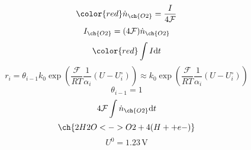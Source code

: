 \documentclass{article}
\begin{document}
	\begin{equation}
		\color{red}
		\dot{n}_{\ch{O2}} = \frac{I}{4\mathcal{F}}
	\end{equation}
	\begin{equation}
		I_{\ch{O2}} = (4\mathcal{F})\dot{n}_{\ch{O2}}
	\end{equation}
	\begin{equation}\color{red}
		\int I \mathrm{d}t
	\end{equation}
	\begin{equation}
	r_i = \theta_{i-1} k_0 \exp\left(\frac{\mathcal{F}}{RT}\frac{1}{\alpha_i}(U - U^\circ_i)\right) \approx k_0 \exp\left(\frac{\mathcal{F}}{RT}\frac{1}{\alpha_i}(U - U^\circ_i)\right)
	\end{equation}
	\begin{equation}
		\theta_{i-1} = 1
	\end{equation}
\begin{equation}
4\mathcal{F}\int \dot{n}_{\ch{O2}} \mathrm{d}t
\end{equation}
\begin{equation}
\ch{2 H2O <-> O2 + 4 (H+ + e-)}
\end{equation}
\begin{equation}
U^0 = 1.23 \, \text{V}
\end{equation}
\end{document}
